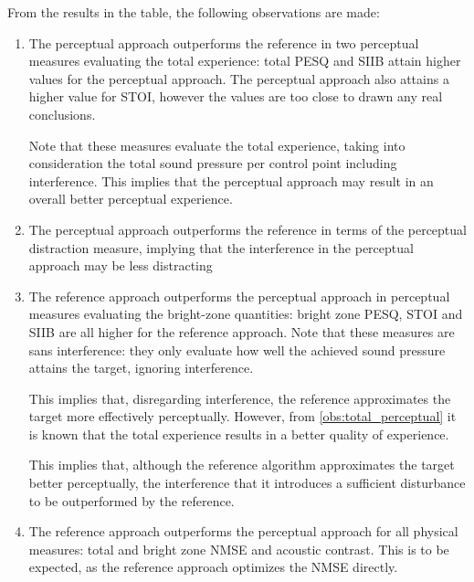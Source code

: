 From the results in the table, the following observations are made:
\begin{enumerate}
    \item The perceptual approach outperforms the reference in two perceptual measures evaluating the total experience:
        total PESQ and SIIB attain higher values for the perceptual approach.
        The perceptual approach also attains a higher value for STOI, 
        however the values are too close to drawn any real conclusions. 

        Note that these measures evaluate the total experience, taking into consideration the total 
        sound pressure per control point including interference.
        This implies that the perceptual approach may result in an overall better perceptual experience.
        \label{obs:total_perceptual}

    \item The perceptual approach outperforms the reference in terms of the perceptual distraction measure,
        implying that the interference in the perceptual approach may be less distracting 
        \label{obs:distraction}

    \item The reference approach outperforms the perceptual approach in perceptual measures evaluating the 
        bright-zone quantities: bright zone PESQ, STOI and SIIB are all higher for the reference approach.
        Note that these measures are sans interference: they only evaluate how well the achieved sound pressure
        attains the target, ignoring interference.

        This implies that, disregarding interference, the reference approximates the target more effectively 
        perceptually.
        However, from \autoref{obs:total_perceptual} it is known that the total experience results in a 
        better quality of experience. 

        This implies that, although the reference algorithm approximates the target better perceptually, 
        the interference that it introduces a sufficient disturbance to be outperformed by the reference.
        \label{obs:bright_zone_perceptual}

    \item The reference approach outperforms the perceptual approach for all physical measures: 
        total and bright zone NMSE and acoustic contrast.
        This is to be expected, as the reference approach optimizes the NMSE directly.


\end{enumerate}
